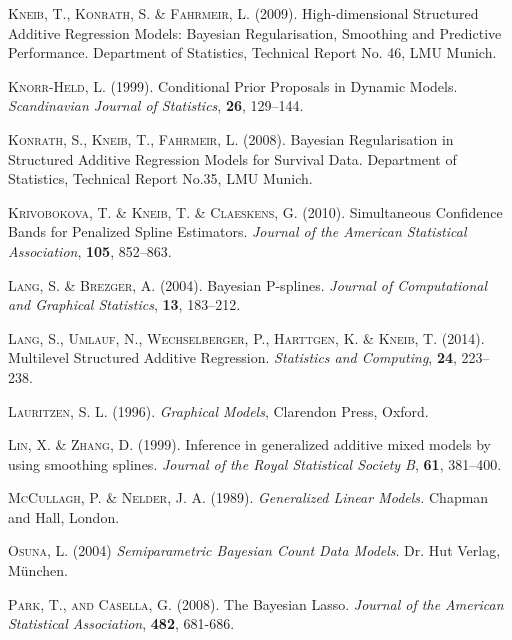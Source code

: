 \begin{thebibliography}{99}
 {\scshape Kneib, T., Konrath, S. \& Fahrmeir, L.} (2009). High-dimensional
 Structured Additive Regression Models: Bayesian Regularisation, Smoothing and Predictive
 Performance. Department of Statistics, Technical Report No. 46, LMU Munich.

 {\scshape Knorr-Held, L.} (1999).
 Conditional Prior Proposals in Dynamic Models.
 {\it Scandinavian Journal of Statistics}, {\bf 26}, 129--144.

 {\scshape Konrath, S., Kneib, T., Fahrmeir, L.} (2008). Bayesian Regularisation
 in Structured Additive Regression Models for Survival Data. Department of Statistics,
 Technical Report No.35, LMU Munich.


 {\scshape Krivobokova, T. \& Kneib, T. \& Claeskens, G.} (2010).
 Simultaneous Confidence Bands for Penalized Spline Estimators.
 {\it Journal of the American Statistical Association}, {\bf 105}, 852--863.



 {\scshape Lang, S. \& Brezger, A.} (2004).
 Bayesian P-splines.
 {\it Journal of Computational and Graphical Statistics}, {\bf 13}, 183--212.

 {\scshape Lang, S., Umlauf, N., Wechselberger, P., Harttgen, K.  \& Kneib, T.} (2014).
 Multilevel Structured Additive Regression.
 {\it Statistics and Computing}, {\bf 24}, 223--238.

 {\scshape Lauritzen, S. L.} (1996).
 {\it Graphical Models},
 Clarendon Press, Oxford.

 {\scshape Lin, X. \& Zhang, D.} (1999).
 Inference in generalized additive mixed models by using smoothing splines.
 {\it Journal of the Royal Statistical Society B}, {\bf 61}, 381--400.

 {\scshape McCullagh, P. \& Nelder, J. A.} (1989).
 {\it Generalized Linear Models.}
 Chapman and Hall, London.

 {\scshape Osuna, L.} (2004)
 {\it Semiparametric Bayesian Count Data Models}.
 Dr. Hut Verlag, M\"{u}nchen.

 {\scshape Park, T., and Casella, G.} (2008). The Bayesian Lasso. {\it Journal
 of the American Statistical Association}, {\bf 482}, 681-686.


\end{thebibliography}
